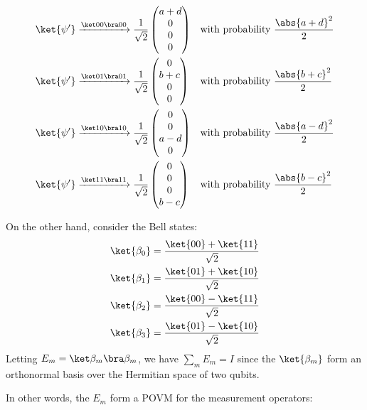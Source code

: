 \begin{align*}
\ket{\psi'} & \xrightarrow{\ketbra{00}{00}} \frac{1}{\sqrt{2}} \begin{pmatrix} a + d \\ 0 \\ 0 \\ 0 \end{pmatrix} && \text{with probability $\frac{\abs{a+d}^2}{2}$} \\
\ket{\psi'} & \xrightarrow{\ketbra{01}{01}} \frac{1}{\sqrt{2}} \begin{pmatrix} 0 \\ b + c \\ 0 \\ 0 \end{pmatrix} && \text{with probability $\frac{\abs{b+c}^2}{2}$} \\
\ket{\psi'} & \xrightarrow{\ketbra{10}{10}} \frac{1}{\sqrt{2}} \begin{pmatrix} 0 \\ 0 \\ a - d \\ 0 \end{pmatrix} && \text{with probability $\frac{\abs{a-d}^2}{2}$} \\
\ket{\psi'} & \xrightarrow{\ketbra{11}{11}} \frac{1}{\sqrt{2}} \begin{pmatrix} 0 \\ 0 \\ 0 \\b - c \end{pmatrix} && \text{with probability $\frac{\abs{b-c}^2}{2}$}
\end{align*}
%
\par On the other hand, consider the Bell states:
%
\begin{align*}
\ket{\beta_0} &= \frac{\ket{00} + \ket{11}}{\sqrt{2}} \\
\ket{\beta_1} &= \frac{\ket{01} + \ket{10}}{\sqrt{2}} \\
\ket{\beta_2} &= \frac{\ket{00} - \ket{11}}{\sqrt{2}} \\
\ket{\beta_3} &= \frac{\ket{01} - \ket{10}}{\sqrt{2}}
\end{align*}
%
Letting $E_m = \ketbra{\beta_m}{\beta_m}$, we have $\sum_m{E_m} = I$ since the $\ket{\beta_m}$ form an orthonormal basis over the Hermitian space of two qubits.
%
\par In other words, the $E_m$ form a POVM for the measurement operators:
%
